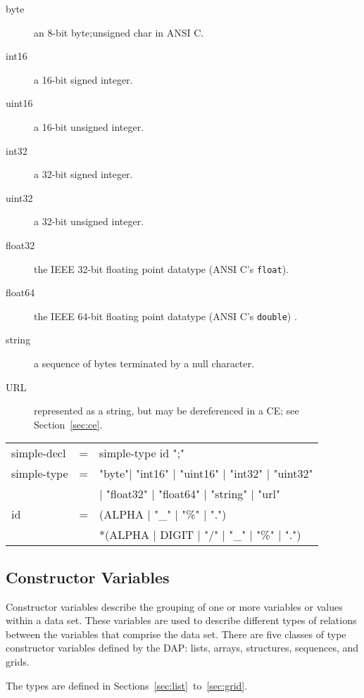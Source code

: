 \documentclass{article}
\begin{document}
\begin{description}
\item [byte] an 8-bit byte;unsigned char in ANSI C\@.
\item [int16] a 16-bit signed integer.
\item [uint16] a 16-bit unsigned integer.
\item [int32] a 32-bit signed integer.
\item [uint32] a 32-bit unsigned integer.
\item [float32] the IEEE 32-bit floating point datatype (ANSI C's
  \texttt{float}). 
\item [float64] the IEEE 64-bit floating point datatype (ANSI C's
  \texttt{double}) .
\item [string] a sequence of bytes terminated by a null character.
\item [URL] represented as a string, but may be dereferenced in a \ac{CE};
  see Section~\ref{sec:ce}.
\end{description}

\begin{ttfamily}
\begin{center}
\begin{tabular}{lll}
simple-decl & = & simple-type id ";" \\
simple-type & = & "byte"| "int16" | "uint16" | "int32" | "uint32" \\
                & & | "float32" | "float64" | "string" | "url" \\
id & = & (ALPHA | "\_" | "\%" | ".") \\
       & & *(ALPHA | DIGIT | "/" | "\_" | "\%" | ".") \\
\end{tabular}
\end{center}
\end{ttfamily}

\subsection{Constructor Variables} 
\label{sec:ctor-vars}

Constructor variables describe the grouping of one or more variables or values
within a data set. These variables are used to describe different types of
relations between the variables that comprise the data set. There are five
classes of type constructor variables defined by the \ac{DAP}: lists, arrays,
structures, sequences, and grids. 

The types are defined in Sections~\ref{sec:list}~to~\ref{sec:grid}.
\end{document}
